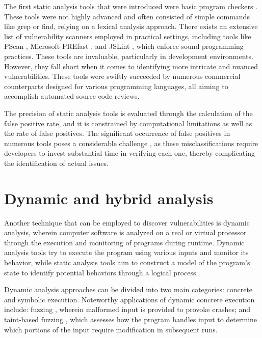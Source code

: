 The first static analysis tools that were introduced were basic program checkers \cite{JViega_2000}. These tools were not highly advanced and often consisted of simple commands like grep or find, relying on a lexical analysis approach. There exists an extensive list of vulnerability scanners employed in practical settings, including tools like PScan \cite{PScan}, Microsoft PREfast \cite{Larus_2004}, and JSLint \cite{JSLint}, which enforce sound programming practices. These tools are invaluable, particularly in development environments. However, they fall short when it comes to identifying more intricate and nuanced vulnerabilities. These tools were swiftly succeeded by numerous commercial counterparts designed for various programming languages, all aiming to accomplish automated source code reviews.

The precision of static analysis tools is evaluated through the calculation of the false positive rate, and it is constrained by computational limitations as well as the rate of false positives. The significant occurrence of false positives in numerous tools poses a considerable challenge \cite{Kui_Liu2018}, as these misclassifications require developers to invest substantial time in verifying each one, thereby complicating the identification of actual issues.




\section{Dynamic and hybrid analysis} %
\label{sec:	Dynamic_hybrid_analysis}

Another technique that can be employed to discover vulnerabilities is dynamic analysis, wherein computer software is analyzed on a real or virtual processor \cite{5066568} through the execution and monitoring of programs during runtime. Dynamic analysis tools try to execute the program using various inputs and monitor its behavior, while static analysis tools aim to construct a model of the program's state to identify potential behaviors through a logical process.

Dynamic analysis approaches can be divided into two main categories: concrete and symbolic execution. Noteworthy applications of dynamic concrete execution include: fuzzing \cite{Godefroid_2012, Vijay_Ganesh2009}, wherein malformed input is provided to provoke crashes; and taint-based fuzzing \cite{Sofia_Bekrar2012}, which assesses how the program handles input to determine which portions of the input require modification in subsequent runs.

